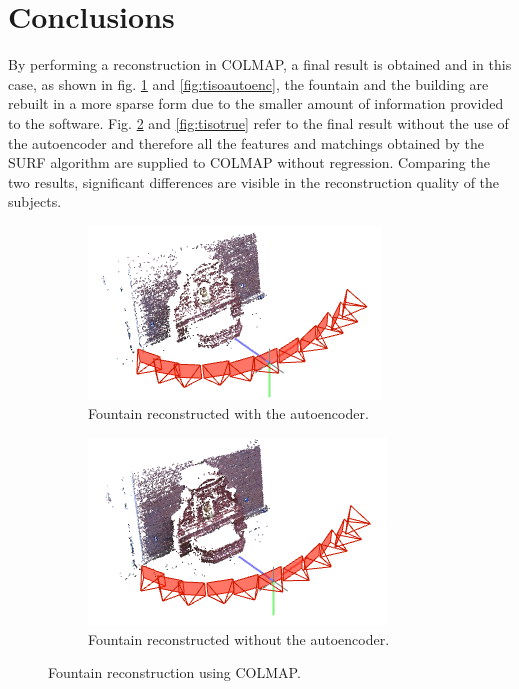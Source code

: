 

\section{Conclusions}
By performing a reconstruction in COLMAP, a final result is obtained and in this case, as shown in fig. \ref{fig:fountainautoenc} and \ref{fig:tisoautoenc}, the fountain and the building are rebuilt in a more sparse form due to the smaller amount of information provided to the software. Fig. \ref{fig:fountaintrue} and \ref{fig:tisotrue} refer to the final result without the use of the autoencoder and therefore all the features and matchings obtained by the SURF algorithm are supplied to COLMAP without regression. Comparing the two results, significant differences are visible in the reconstruction quality of the subjects.


\begin{figure}[H]
     \centering
     \begin{subfigure}[b]{0.48\textwidth}
		\centering
		\includegraphics[width=\textwidth]{images/fountainautoenc.png}  
		\caption{\centering Fountain reconstructed with the autoencoder.}
	    	\label{fig:fountainautoenc} 
     \end{subfigure}
     \hfill
     \begin{subfigure}[b]{0.48\textwidth}
		\centering
    		\includegraphics[width=\textwidth]{images/fountaintrue.png}
		\caption{\centering Fountain reconstructed without the autoencoder.}
		\label{fig:fountaintrue}   
     \end{subfigure}
        \caption{Fountain reconstruction using COLMAP.}
        \label{fig:Fountain3D}
\end{figure}



